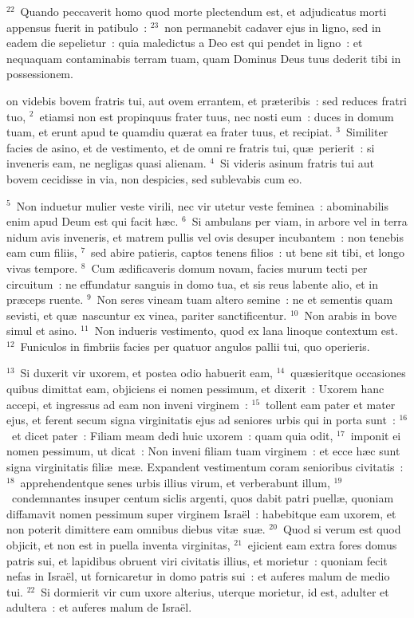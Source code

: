 ${}^{22}$~Quando peccaverit homo quod morte plectendum est, et adjudicatus morti appensus fuerit in patibulo~:
${}^{23}$~non permanebit cadaver ejus in ligno, sed in eadem die sepelietur~: quia maledictus a Deo est qui pendet in ligno~: et nequaquam contaminabis terram tuam, quam Dominus Deus tuus dederit tibi in possessionem.

\bchapter
{}on videbis bovem fratris tui, aut ovem errantem, et pr\ae teribis~: sed reduces fratri tuo,
${}^{2}$~etiamsi non est propinquus frater tuus, nec nosti eum~: duces in domum tuam, et erunt apud te quamdiu qu\ae rat ea frater tuus, et recipiat.
${}^{3}$~Similiter facies de asino, et de vestimento, et de omni re fratris tui, qu\ae\ perierit~: si inveneris eam, ne negligas quasi alienam.
${}^{4}$~Si videris asinum fratris tui aut bovem cecidisse in via, non despicies, sed sublevabis cum eo.


${}^{5}$~Non induetur mulier veste virili, nec vir utetur veste feminea~: abominabilis enim apud Deum est qui facit h\ae c.
${}^{6}$~Si ambulans per viam, in arbore vel in terra nidum avis inveneris, et matrem pullis vel ovis desuper incubantem~: non tenebis eam cum filiis,
${}^{7}$~sed abire patieris, captos tenens filios~: ut bene sit tibi, et longo vivas tempore.
${}^{8}$~Cum \ae dificaveris domum novam, facies murum tecti per circuitum~: ne effundatur sanguis in domo tua, et sis reus labente alio, et in pr\ae ceps ruente.
${}^{9}$~Non seres vineam tuam altero semine~: ne et sementis quam sevisti, et qu\ae\ nascuntur ex vinea, pariter sanctificentur.
${}^{10}$~Non arabis in bove simul et asino.
${}^{11}$~Non indueris vestimento, quod ex lana linoque contextum est.
${}^{12}$~Funiculos in fimbriis facies per quatuor angulos pallii tui, quo operieris.


${}^{13}$~Si duxerit vir uxorem, et postea odio habuerit eam,
${}^{14}$~qu\ae sieritque occasiones quibus dimittat eam, objiciens ei nomen pessimum, et dixerit~: Uxorem hanc accepi, et ingressus ad eam non inveni virginem~:
${}^{15}$~tollent eam pater et mater ejus, et ferent secum signa virginitatis ejus ad seniores urbis qui in porta sunt~:
${}^{16}$~et dicet pater~: Filiam meam dedi huic uxorem~: quam quia odit,
${}^{17}$~imponit ei nomen pessimum, ut dicat~: Non inveni filiam tuam virginem~: et ecce h\ae c sunt signa virginitatis fili\ae\ me\ae . Expandent vestimentum coram senioribus civitatis~:
${}^{18}$~apprehendentque senes urbis illius virum, et verberabunt illum,
${}^{19}$~condemnantes insuper centum siclis argenti, quos dabit patri puell\ae , quoniam diffamavit nomen pessimum super virginem Isra\"el~: habebitque eam uxorem, et non poterit dimittere eam omnibus diebus vit\ae\ su\ae .
${}^{20}$~Quod si verum est quod objicit, et non est in puella inventa virginitas,
${}^{21}$~ejicient eam extra fores domus patris sui, et lapidibus obruent viri civitatis illius, et morietur~: quoniam fecit nefas in Isra\"el, ut fornicaretur in domo patris sui~: et auferes malum de medio tui.
${}^{22}$~Si dormierit vir cum uxore alterius, uterque morietur, id est, adulter et adultera~: et auferes malum de Isra\"el.


